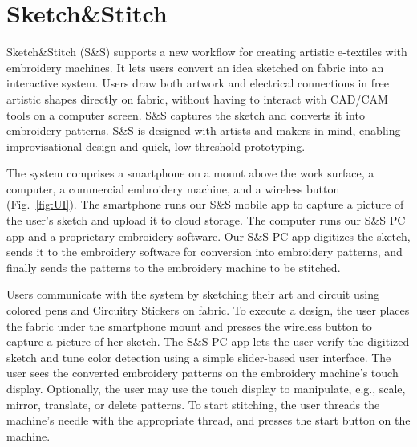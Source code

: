 \documentclass[header.tex]{subfiles}
\begin{document}
\section{Sketch\&Stitch}
Sketch\&Stitch (S\&S) supports a new workflow for creating artistic e-textiles with embroidery machines. It lets users convert an idea sketched on fabric into an interactive system.  Users draw both artwork and electrical connections in free artistic shapes directly on fabric, without having to interact with CAD/CAM tools on a computer screen. S\&S captures the sketch and converts it into embroidery patterns. 
S\&S is designed with artists and makers in mind, enabling improvisational design and quick, low-threshold prototyping.



The system comprises a smartphone on a mount above the work surface, a computer, a commercial embroidery machine, and a wireless button (Fig.\ \ref{fig:UI}). The smartphone runs our S\&S mobile app to capture a picture of the user's sketch and upload it to cloud storage. The computer runs our S\&S PC app and a proprietary embroidery software. %
Our S\&S PC app digitizes the sketch, sends it to the embroidery software for conversion into embroidery patterns, and finally sends the patterns to the embroidery machine to be stitched. 


Users communicate with the system by sketching their art and circuit using colored pens and Circuitry Stickers on fabric.
To execute a design, the user places the fabric under the smartphone mount and presses the wireless button to capture a picture of her sketch. The S\&S PC app lets the user verify the digitized sketch and tune color detection using a simple slider-based user interface. The user sees the converted embroidery patterns on the embroidery machine's touch display. Optionally, the user may use the touch display to manipulate, e.g., scale, mirror, translate, or delete patterns. %
To start stitching, the user threads the machine's needle with the appropriate thread, and presses the start button on the machine.
\end{document}
